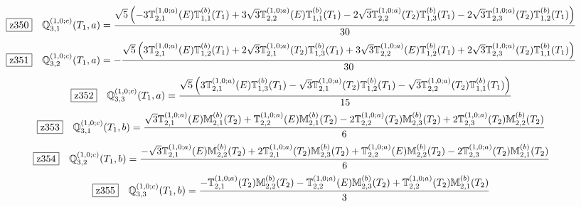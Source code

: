 \documentclass[fleqn,10pt,landscape]{jsarticle}
\begin{document}
\begin{dmath*}
\hspace*{3mm}\fbox{z350}\quad \mathbb{Q}_{3,1}^{(1,0;c)}(T_{1},a)=\frac{\sqrt{5} \left(- 3 \mathbb{T}_{2,1}^{(1,0;a)}(E) \mathbb{T}_{1,1}^{(b)}(T_{1}) + 3 \sqrt{3} \mathbb{T}_{2,2}^{(1,0;a)}(E) \mathbb{T}_{1,1}^{(b)}(T_{1}) - 2 \sqrt{3} \mathbb{T}_{2,2}^{(1,0;a)}(T_{2}) \mathbb{T}_{1,3}^{(b)}(T_{1}) - 2 \sqrt{3} \mathbb{T}_{2,3}^{(1,0;a)}(T_{2}) \mathbb{T}_{1,2}^{(b)}(T_{1})\right)}{30}
\end{dmath*}
\begin{dmath*}
\hspace*{3mm}\fbox{z351}\quad \mathbb{Q}_{3,2}^{(1,0;c)}(T_{1},a)=- \frac{\sqrt{5} \left(3 \mathbb{T}_{2,1}^{(1,0;a)}(E) \mathbb{T}_{1,2}^{(b)}(T_{1}) + 2 \sqrt{3} \mathbb{T}_{2,1}^{(1,0;a)}(T_{2}) \mathbb{T}_{1,3}^{(b)}(T_{1}) + 3 \sqrt{3} \mathbb{T}_{2,2}^{(1,0;a)}(E) \mathbb{T}_{1,2}^{(b)}(T_{1}) + 2 \sqrt{3} \mathbb{T}_{2,3}^{(1,0;a)}(T_{2}) \mathbb{T}_{1,1}^{(b)}(T_{1})\right)}{30}
\end{dmath*}
\begin{dmath*}
\hspace*{3mm}\fbox{z352}\quad \mathbb{Q}_{3,3}^{(1,0;c)}(T_{1},a)=\frac{\sqrt{5} \left(3 \mathbb{T}_{2,1}^{(1,0;a)}(E) \mathbb{T}_{1,3}^{(b)}(T_{1}) - \sqrt{3} \mathbb{T}_{2,1}^{(1,0;a)}(T_{2}) \mathbb{T}_{1,2}^{(b)}(T_{1}) - \sqrt{3} \mathbb{T}_{2,2}^{(1,0;a)}(T_{2}) \mathbb{T}_{1,1}^{(b)}(T_{1})\right)}{15}
\end{dmath*}
\begin{dmath*}
\hspace*{3mm}\fbox{z353}\quad \mathbb{Q}_{3,1}^{(1,0;c)}(T_{1},b)=\frac{\sqrt{3} \mathbb{T}_{2,1}^{(1,0;a)}(E) \mathbb{M}_{2,1}^{(b)}(T_{2}) + \mathbb{T}_{2,2}^{(1,0;a)}(E) \mathbb{M}_{2,1}^{(b)}(T_{2}) - 2 \mathbb{T}_{2,2}^{(1,0;a)}(T_{2}) \mathbb{M}_{2,3}^{(b)}(T_{2}) + 2 \mathbb{T}_{2,3}^{(1,0;a)}(T_{2}) \mathbb{M}_{2,2}^{(b)}(T_{2})}{6}
\end{dmath*}
\begin{dmath*}
\hspace*{3mm}\fbox{z354}\quad \mathbb{Q}_{3,2}^{(1,0;c)}(T_{1},b)=\frac{- \sqrt{3} \mathbb{T}_{2,1}^{(1,0;a)}(E) \mathbb{M}_{2,2}^{(b)}(T_{2}) + 2 \mathbb{T}_{2,1}^{(1,0;a)}(T_{2}) \mathbb{M}_{2,3}^{(b)}(T_{2}) + \mathbb{T}_{2,2}^{(1,0;a)}(E) \mathbb{M}_{2,2}^{(b)}(T_{2}) - 2 \mathbb{T}_{2,3}^{(1,0;a)}(T_{2}) \mathbb{M}_{2,1}^{(b)}(T_{2})}{6}
\end{dmath*}
\begin{dmath*}
\hspace*{3mm}\fbox{z355}\quad \mathbb{Q}_{3,3}^{(1,0;c)}(T_{1},b)=\frac{- \mathbb{T}_{2,1}^{(1,0;a)}(T_{2}) \mathbb{M}_{2,2}^{(b)}(T_{2}) - \mathbb{T}_{2,2}^{(1,0;a)}(E) \mathbb{M}_{2,3}^{(b)}(T_{2}) + \mathbb{T}_{2,2}^{(1,0;a)}(T_{2}) \mathbb{M}_{2,1}^{(b)}(T_{2})}{3}
\end{dmath*}
\end{document}
